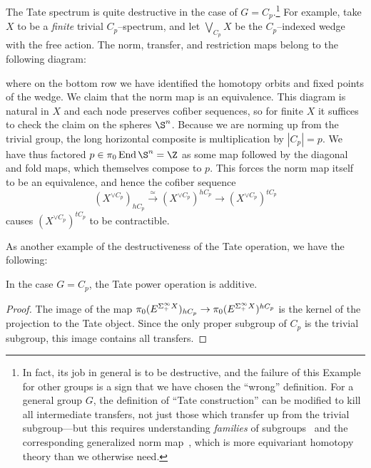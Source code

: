 \begin{example}\label{TateDestruction}
The Tate spectrum is quite destructive in the case of \(G = C_p\).\footnote{In fact, its job in general is to be destructive, and the failure of this Example for other groups is a sign that we have chosen the ``wrong'' definition.  For a general group \(G\), the definition of ``Tate construction'' can be modified to kill all intermediate transfers, not just those which transfer up from the trivial subgroup---but this requires understanding \textit{families} of subgroups~\cite[Section XXI.4]{MayAlaskaNotes} and the corresponding generalized norm map~\cite[Section XXV.6]{MayAlaskaNotes}, which is more equivariant homotopy theory than we otherwise need.}  For example, take \(X\) to be a \emph{finite} trivial \(C_p\)--spectrum, and let \(\bigvee_{C_p} X\) be the \(C_p\)--indexed wedge with the free action.  The norm, transfer, and restriction maps belong to the following diagram:
\begin{center}
\end{center}
where on the bottom row we have identified the homotopy orbits and fixed points of the wedge.  We claim that the norm map is an equivalence.  This diagram is natural in \(X\) and each node preserves cofiber sequences, so for finite \(X\) it suffices to check the claim on the spheres \(\S^n\).  Because we are norming up from the trivial group, the long horizontal composite is multiplication by \(|C_p| = p\).  We have thus factored \(p \in \pi_0 \End \S^n = \Z\) as some map followed by the diagonal and fold maps, which themselves compose to \(p\).  This forces the norm map itself to be an equivalence, and hence the cofiber sequence \[(X^{\vee C_p})_{hC_p} \xrightarrow{\simeq} (X^{\vee C_p})^{hC_p} \to (X^{\vee C_p})^{tC_p}\] causes \((X^{\vee C_p})^{tC_p}\) to be contractible.
\end{example}

As another example of the destructiveness of the Tate operation, we have the following:

\begin{lemma}
In the case \(G = C_p\), the Tate power operation is additive.
\end{lemma}
\begin{proof}
The image of the map \(\pi_0 (E^{\Sigma^\infty_+ X})_{hC_p} \to \pi_0 (E^{\Sigma^\infty_+ X})^{hC_p}\) is the kernel of the projection to the Tate object.  Since the only proper subgroup of \(C_p\) is the trivial subgroup, this image contains all transfers.
\end{proof}

